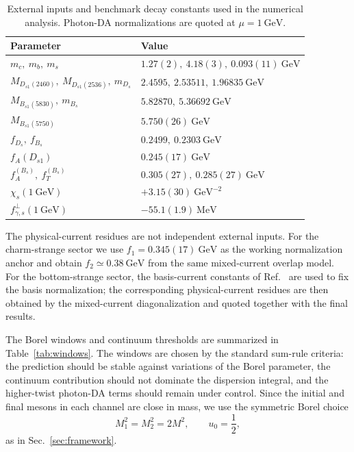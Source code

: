 \documentclass[aps,prd,preprint,nofootinbib,superscriptaddress]{revtex4-2}
\newcommand{\Ds}{D_s}
\newcommand{\Dsone}{D_{s1}}
\newcommand{\Bs}{B_s}
\newcommand{\Bsone}{B_{s1}}
\newcommand{\GeV}{\mathrm{GeV}}
\newcommand{\MeV}{\mathrm{MeV}}
\begin{document}
\begin{table}[t]
\caption{External inputs and benchmark decay constants used in the numerical
analysis.  Photon-DA normalizations are quoted at $\mu=1~\GeV$.}
\label{tab:inputs}
\begin{ruledtabular}
\begin{tabular}{ll}
Parameter & Value \\
\hline
$m_c,\ m_b,\ m_s$
& $1.27(2),\ 4.18(3),\ 0.093(11)~\GeV$
  \cite{ParticleDataGroup:2024cfk} \\
$M_{\Dsone(2460)},\ M_{\Dsone(2536)},\ m_{\Ds}$
& $2.4595,\ 2.53511,\ 1.96835~\GeV$
  \cite{ParticleDataGroup:2024cfk} \\
$M_{\Bsone(5830)},\ m_{\Bs}$
& $5.82870,\ 5.36692~\GeV$
  \cite{ParticleDataGroup:2024cfk,CMS:2018qdl} \\
$M_{\Bsone(5750)}$
& $5.750(26)~\GeV$ \cite{Lang:2015hza} \\
$f_{\Ds},\ f_{\Bs}$
& $0.2499,\ 0.2303~\GeV$
  \cite{FlavourLatticeAveragingGroupFLAG:2024oxs} \\
$f_A(\Dsone)$
& $0.245(17)~\GeV$ \cite{Wang:2015mxa} \\
$f_A^{(B_s)},\ f_T^{(B_s)}$
& $0.305(27),\ 0.285(27)~\GeV$
  \cite{Pullin:2021ebn} \\
$\chi_s(1~\GeV)$
& $+3.15(30)~\GeV^{-2}$ \cite{Rohrwild:2007yt} \\
$f_{\gamma,s}^{\perp}(1~\GeV)$
& $-55.1(1.9)~\MeV$ \cite{Bacchio:2024pij} \\
\end{tabular}
\end{ruledtabular}
\end{table}

The physical-current residues are not independent external inputs.  For the
charm-strange sector we use $f_1=0.345(17)~\GeV$ as the working normalization
anchor and obtain $f_2\simeq0.38~\GeV$ from the same mixed-current overlap
model.  For the bottom-strange sector, the basis-current constants of
Ref.~\cite{Pullin:2021ebn} are used to fix the basis normalization; the
corresponding physical-current residues are then obtained by the mixed-current
diagonalization and quoted together with the final results.

The Borel windows and continuum thresholds are summarized in
Table~\ref{tab:windows}.  The windows are chosen by the standard sum-rule
criteria: the prediction should be stable against variations of the Borel
parameter, the continuum contribution should not dominate the dispersion
integral, and the higher-twist photon-DA terms should remain under control.
Since the initial and final mesons in each channel are close in mass, we use
the symmetric Borel choice
\begin{equation}
  M_1^2=M_2^2=2M^2,
  \qquad
  u_0=\frac12 ,
  \label{eq:numerical-borel-choice}
\end{equation}
as in Sec.~\ref{sec:framework}.
\end{document}
